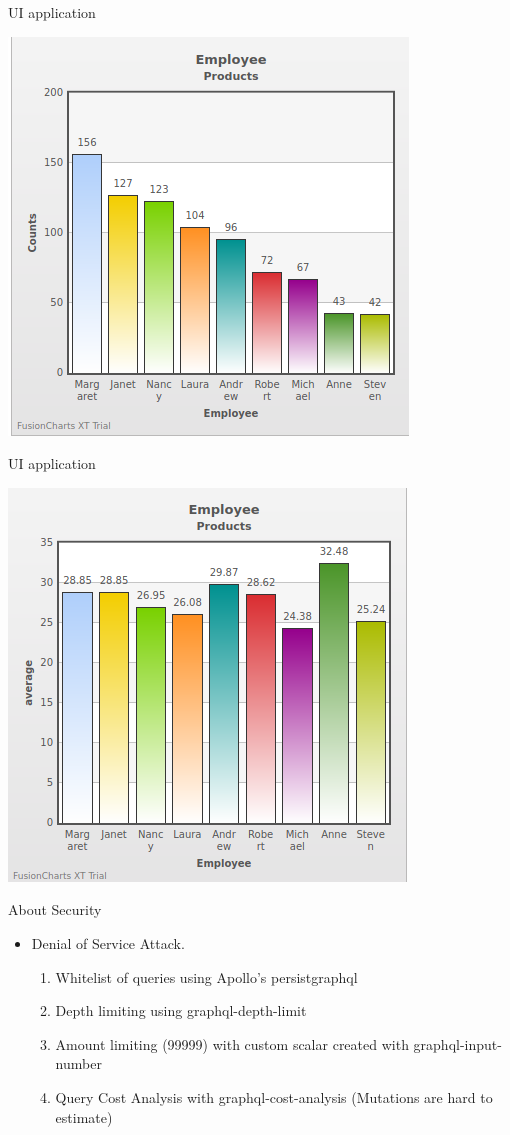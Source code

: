 \documentclass{beamer}
\begin{document}
\begin{frame}{UI application}{ }

\begin{center}
	\includegraphics[width=0.5\linewidth]{img/outputgraph.png}
\end{center}
\end{frame}

\begin{frame}{UI application}{ }

\begin{center}
	\includegraphics[width=0.5\linewidth]{img/outputgraph1.png}
\end{center}
\end{frame}


\begin{frame}{About Security}{ }

\begin{itemize}
\item Denial of Service Attack.
		\begin{enumerate}
		\item Whitelist of queries using Apollo's persistgraphql
		\item Depth limiting using  graphql-depth-limit
		\item Amount limiting (99999) with custom scalar created with graphql-input-number
		\item Query Cost Analysis with graphql-cost-analysis (Mutations are hard to estimate)
		\end{enumerate}
		 
		 
\end{itemize}
\end{frame}
\end{document}
